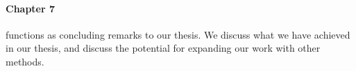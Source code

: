 
\paragraph{Chapter 7} functions as concluding remarks to our thesis. We discuss what we have achieved in our thesis, and discuss the potential for expanding our work with other methods.